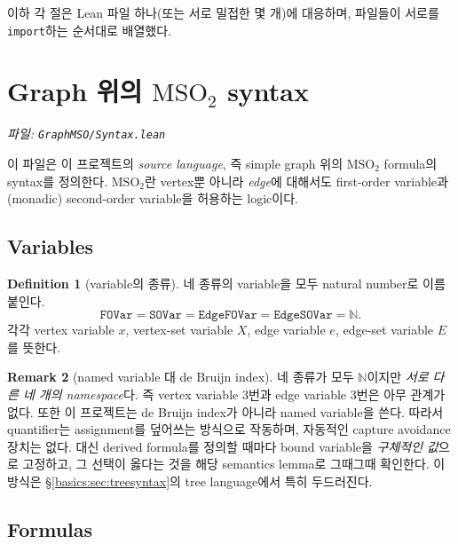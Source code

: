\documentclass[11pt]{article}
\theoremstyle{definition}
\newtheorem{definition}{Definition}[section]
\newtheorem{remark}[definition]{Remark}
\theoremstyle{plain}
\newcommand{\MSOtwo}{\mathrm{MSO}_2}
\newcommand{\lean}[1]{\texttt{#1}}
\newcommand{\leanfile}[1]{\texttt{#1}}
\begin{document}
\bigskip

이하 각 절은 Lean 파일 하나(또는 서로 밀접한 몇 개)에 대응하며, 파일들이
서로를 \lean{import}하는 순서대로 배열했다.

\section{Graph 위의 \texorpdfstring{$\MSOtwo$}{MSO2} syntax}
\label{basics:sec:syntax}

\emph{파일: \leanfile{GraphMSO/Syntax.lean}}

이 파일은 이 프로젝트의 \emph{source language}, 즉 simple graph 위의
$\MSOtwo$ formula의 syntax를 정의한다. $\MSOtwo$란 vertex뿐 아니라
\emph{edge}에 대해서도 first-order variable과 (monadic) second-order variable을
허용하는 logic이다.

\subsection{Variables}

\begin{definition}[variable의 종류]
\label{basics:def:vars}
네 종류의 variable을 모두 natural number로 이름 붙인다.
\[
  \lean{FOVar} = \lean{SOVar} = \lean{EdgeFOVar} = \lean{EdgeSOVar} = \mathbb{N}.
\]
각각 vertex variable $x$, vertex-set variable $X$, edge variable $e$,
edge-set variable $E$를 뜻한다.
\end{definition}

\begin{remark}[named variable 대 de Bruijn index]
네 종류가 모두 $\mathbb{N}$이지만 \emph{서로 다른 네 개의 namespace}다.
즉 vertex variable $3$번과 edge variable $3$번은 아무 관계가 없다. 또한 이
프로젝트는 de Bruijn index가 아니라 named variable을 쓴다. 따라서 quantifier는
assignment를 덮어쓰는 방식으로 작동하며, 자동적인 capture avoidance 장치는
없다. 대신 derived formula를 정의할 때마다 bound variable을 \emph{구체적인
값}으로 고정하고, 그 선택이 옳다는 것을 해당 semantics lemma로 그때그때
확인한다. 이 방식은 \S\ref{basics:sec:treesyntax}의 tree language에서 특히
두드러진다.
\end{remark}

\subsection{Formulas}
\end{document}
